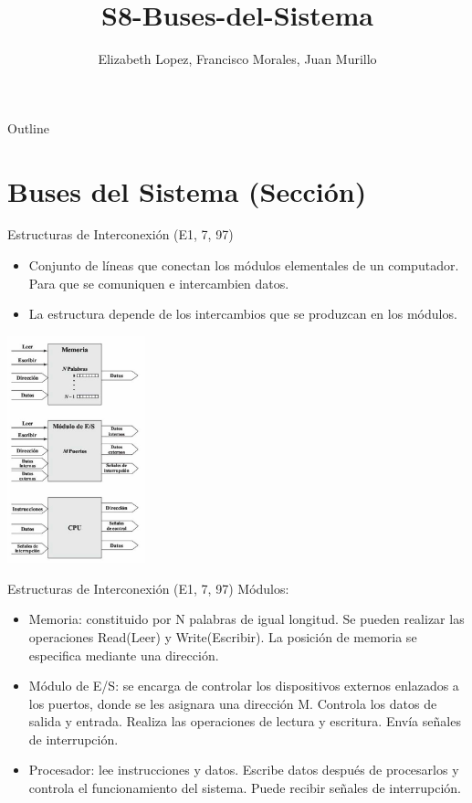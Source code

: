 \documentclass[presentation]{beamer}
\author{Elizabeth Lopez, Francisco Morales, Juan Murillo}
\date{}
\title{S8-Buses-del-Sistema}
\begin{document}
\maketitle
\begin{frame}{Outline}
\tableofcontents
\end{frame}



\section{Buses del Sistema (Sección)}
\label{sec:org24439da}
\begin{frame}[label={sec:org2dd0334}]{Estructuras de Interconexión (E1, 7, 97)}
\begin{itemize}
\item Conjunto de líneas que conectan los módulos elementales de un computador.
Para que se comuniquen e intercambien datos.
\item La estructura depende de los intercambios que se produzcan en los módulos.
\end{itemize}

\begin{center}
\includegraphics[width=0.3\textwidth]{./Images/Modulos.jpg}
\end{center}
\end{frame}

\begin{frame}[label={sec:org540a06e}]{Estructuras de Interconexión (E1, 7, 97)}
\alert{Módulos:}

\begin{itemize}
\item \alert{\alert{Memoria:}} constituido por N palabras de igual longitud. Se pueden realizar las
operaciones Read(Leer) y Write(Escribir). La posición de memoria se especifica
mediante una dirección.
\item \alert{\alert{Módulo de E/S:}} se encarga de controlar los dispositivos externos enlazados
a los puertos, donde se les asignara una dirección M. Controla los datos de salida
y entrada. Realiza las operaciones de lectura y escritura. Envía señales de interrupción.
\item \alert{\alert{Procesador:}} lee instrucciones y datos. Escribe datos después de procesarlos y
controla el funcionamiento del sistema. Puede recibir señales de interrupción.
\end{itemize}
\end{frame}
\end{document}

